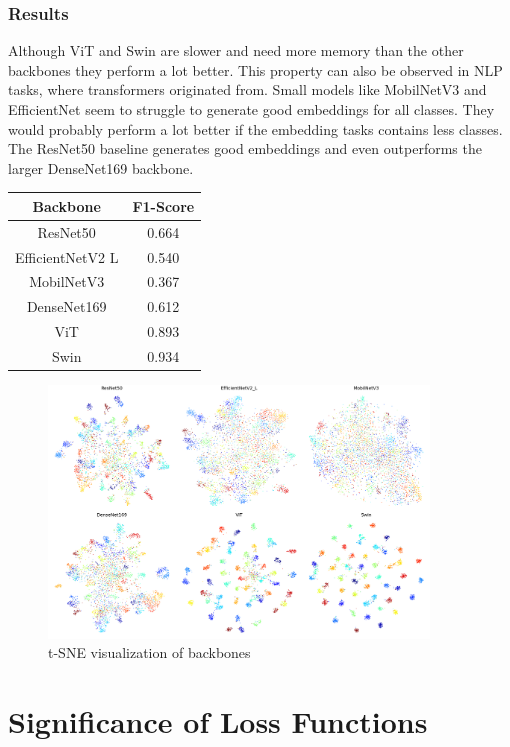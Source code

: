\documentclass[12pt,a4paper]{report}
\newcommand{\splitlayout}[2]{
	\begin{minipage}{0.6\textwidth}
		#1
	\end{minipage}
	\hfill
	\begin{minipage}{0.35\textwidth}
		#2
	\end{minipage}	
}
\begin{document}
\subsubsection{Results}

\splitlayout{
	Although ViT and Swin are slower and need more memory than the other backbones they perform a lot better.
	This property can also be observed in NLP tasks, where transformers originated from.
	Small models like MobilNetV3 and EfficientNet seem to struggle to generate good embeddings for all classes.
	They would probably perform a lot better if the embedding tasks contains less classes.
	The ResNet50 baseline generates good embeddings and even outperforms the larger DenseNet169 backbone.
}{
	\begin{tabular}{ | c | c | }
		\hline
		Backbone & F1-Score \\ 
		\hline
		ResNet50 & 0.664 \\ 
		\hline
		EfficientNetV2 L & 0.540 \\ 
		\hline
		MobilNetV3 & 0.367 \\ 
		\hline
		DenseNet169 & 0.612 \\ 
		\hline
		ViT & 0.893 \\ 
		\hline
		Swin & 0.934 \\ 
		\hline
	\end{tabular}
}

\begin{figure}[h]
	\centering
	\includegraphics[width=0.9\textwidth]{../plots/backbones.png}
	\caption{t-SNE visualization of backbones}
\end{figure}

\newpage

\section{Significance of Loss Functions}
\end{document}
